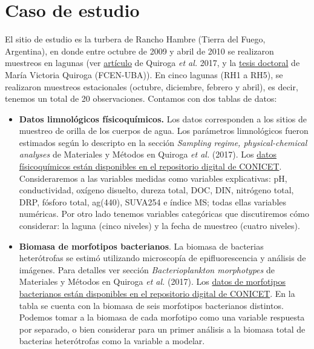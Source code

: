 \documentclass[
]{book}
\begin{document}
\hypertarget{caso-de-estudio}{%
\section{Caso de estudio}\label{caso-de-estudio}}

El sitio de estudio es la turbera de Rancho Hambre (Tierra del Fuego, Argentina), en donde entre octubre de 2009 y abril de 2010 se realizaron muestreos en lagunas (ver \href{https://link.springer.com/article/10.1007/s10750-016-2969-2}{artículo} de Quiroga \emph{et al.} 2017, y la \href{http://hdl.handle.net/20.500.12110/tesis_n5433_Quiroga}{tesis doctoral} de María Victoria Quiroga (FCEN-UBA)). En cinco lagunas (RH1 a RH5), se realizaron muestreos estacionales (octubre, diciembre, febrero y abril), es decir, tenemos un total de 20 observaciones. Contamos con dos tablas de datos:

\begin{itemize}
\item
  \textbf{Datos limnológicos físicoquímicos.} Los datos corresponden a los sitios de muestreo de orilla de los cuerpos de agua. Los parámetros limnológicos fueron estimados según lo descripto en la sección \emph{Sampling regime, physical-chemical analyses} de Materiales y Métodos en Quiroga \emph{et al.} (2017). Los \href{http://hdl.handle.net/11336/201874}{datos físicoquímicos están disponibles en el repositorio digital de CONICET}. Consideraremos a las variables medidas como variables explicativas: pH, conductividad, oxígeno disuelto, dureza total, DOC, DIN, nitrógeno total, DRP, fósforo total, ag(440), SUVA254 e índice MS; todas ellas variables numéricas. Por otro lado tenemos variables categóricas que discutiremos cómo considerar: la laguna (cinco niveles) y la fecha de muestreo (cuatro niveles).
\item
  \textbf{Biomasa de morfotipos bacterianos}. La biomasa de bacterias heterótrofas se estimó utilizando microscopía de epifluorescencia y análisis de imágenes. Para detalles ver sección \emph{Bacterioplankton morphotypes} de Materiales y Métodos en Quiroga \emph{et al.} (2017). Los \href{http://hdl.handle.net/11336/201811}{datos de morfotipos bacterianos están disponibles en el repositorio digital de CONICET}. En la tabla se cuenta con la biomasa de seis morfotipos bacterianos distintos. Podemos tomar a la biomasa de cada morfotipo como una variable respuesta por separado, o bien considerar para un primer análisis a la biomasa total de bacterias heterótrofas como la variable a modelar.
\end{itemize}
\end{document}
